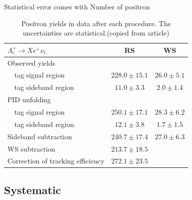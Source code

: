\documentclass{beamer}
\begin{document}
\begin{frame}
    Statistical error comes with Number of positron
    \begin{table}
        \centering
        \caption{ Positron yields in data after each procedure. The uncertainties are statistical.(copied from article)}
        \begin{tabular}{lcc}
            \hline
            \hline
            $\Lambda_c^+ \rightarrow X e^+ \nu_e$ & {RS}           & {WS}          \\
            \hline
            Observed yields                                                        \\
            ~~tag signal region                   & $228.0\pm15.1$ & $26.0\pm5.1$  \\
            ~~tag sideband region                 & $11.0\pm3.3$   & {$2.0\pm1.4$} \\

            PID unfolding                                                          \\
            ~~tag signal region                   & $250.1\pm17.1$ & $28.3\pm6.2$  \\
            ~~tag sideband region                 & $12.1\pm3.8$   & $1.7\pm1.5$   \\

            Sideband subtraction                  & $240.7\pm17.4$ & $27.0\pm6.3$  \\
            WS subtraction                        & $213.7\pm18.5$ &               \\
            Correction of tracking efficiency     & $272.1\pm23.5$ &               \\

            \hline
            \hline
        \end{tabular}
        \label{table: summary of signal yields}
    \end{table}
\end{frame}
\subsection{Systematic}
\end{document}
